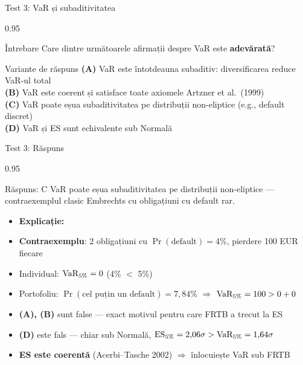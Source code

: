 \documentclass[9pt, aspectratio=169, t]{beamer}
\begin{document}
\begin{frame}[shrink=10]{Test 3: VaR și subaditivitatea}
\begin{cminipage}{0.95\textwidth}
    \begin{alertblock}{Întrebare}
    Care dintre următoarele afirmații despre VaR este \textbf{adevărată}?
    \end{alertblock}
    \vspace{0.4cm}
    \begin{block}{Variante de răspuns}
    \textcolor{MainBlue}{\textbf{(A)}} VaR este întotdeauna subaditiv: diversificarea reduce VaR-ul total \\[3pt]
    \textcolor{MainBlue}{\textbf{(B)}} VaR este coerent și satisface toate axiomele Artzner et al.\ (1999) \\[3pt]
    \textcolor{MainBlue}{\textbf{(C)}} VaR poate eșua subaditivitatea pe distribuții non-eliptice (e.g., default discret) \\[3pt]
    \textcolor{MainBlue}{\textbf{(D)}} VaR și ES sunt echivalente sub Normală
    \end{block}
\end{cminipage}
\end{frame}

\begin{frame}[shrink=10]{Test 3: Răspuns}
\begin{cminipage}{0.95\textwidth}
    \begin{exampleblock}{Răspuns: C}
    VaR poate eșua subaditivitatea pe distribuții non-eliptice --- contraexemplul clasic Embrechts cu obligațiuni cu default rar.
    \end{exampleblock}
    \vspace{0.2cm}
    \begin{itemize}\setlength{\itemsep}{0pt}
        \item \textbf{Explicație:}
        \item \textbf{Contraexemplu}: 2 obligațiuni cu $\Pr(\text{default}) = 4\%$, pierdere 100 EUR fiecare
        \item Individual: $\text{VaR}_{5\%} = 0$ (4\% $<$ 5\%)
        \item Portofoliu: $\Pr(\text{cel puțin un default}) = 7{,}84\%$ $\Rightarrow$ $\text{VaR}_{5\%} = 100 > 0+0$
        \item \textbf{(A), (B)} sunt false --- exact motivul pentru care FRTB a trecut la ES
        \item \textbf{(D)} este fals --- chiar sub Normală, $\text{ES}_{5\%} = 2{,}06\sigma > \text{VaR}_{5\%} = 1{,}64\sigma$
        \item \textbf{ES este coerentă} (Acerbi--Tasche 2002) $\Rightarrow$ înlocuiește VaR sub FRTB
    \end{itemize}
\end{cminipage}
\end{frame}
\end{document}
